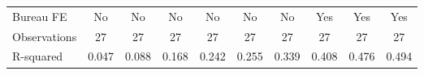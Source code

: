 {\begin{tabular}{l*{9}{c}}
Bureau FE   &          No         &          No         &          No         &          No         &          No         &          No         &         Yes         &         Yes         &         Yes         \\
Observations&          27         &          27         &          27         &          27         &          27         &          27         &          27         &          27         &          27         \\
R-squared   &       0.047         &       0.088         &       0.168         &       0.242         &       0.255         &       0.339         &       0.408         &       0.476         &       0.494         \\
\bottomrule
\end{tabular}
}
